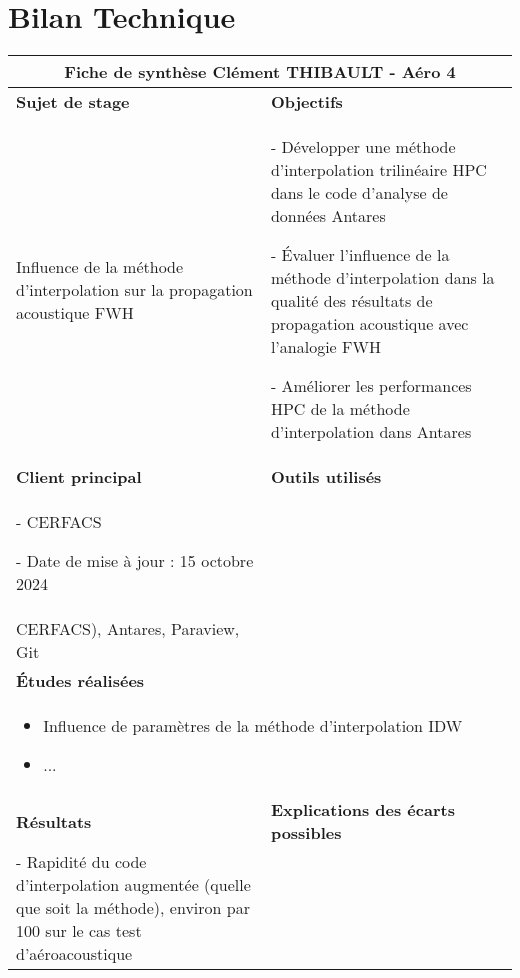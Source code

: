 \section*{Bilan Technique}
\begin{table}[ht]
\centering
\begin{tabular}{|p{8cm}|p{8cm}|}
\hline
\multicolumn{2}{|c|}{\textbf{Fiche de synthèse}   \hspace{7cm}   Clément THIBAULT - Aéro 4} \\ 
\hline
\textbf{Sujet de stage} & \textbf{Objectifs} \\ 
\hline
\begin{minipage}[t]{8cm}
Influence de la méthode d’interpolation sur la propagation acoustique FWH

\end{minipage} & 
\begin{minipage}[t]{8cm}
- Développer une méthode d’interpolation trilinéaire HPC dans le code d’analyse de données Antares

- Évaluer l’influence de la méthode d’interpolation dans la qualité des résultats de propagation acoustique avec l’analogie FWH

- Améliorer les performances HPC de la méthode d’interpolation dans Antares
\end{minipage} \\ 
\hline
\textbf{Client principal} & \textbf{Outils utilisés} \\ 
\hline
\begin{minipage}[t]{8cm}
- CERFACS

- Date de mise à jour : 15 octobre 2024
\end{minipage} & 
\begin{minipage}[t]{8cm}
VSCode, Python, Kraken (supercalculateur du\\
CERFACS), Antares, Paraview, Git
\end{minipage} \\ 
\hline
\multicolumn{2}{|l|}{\textbf{Études réalisées}} \\ 
\hline
\multicolumn{2}{|p{14cm}|}{
\begin{minipage}[t]{14cm}
\begin{itemize}
    \item Influence de paramètres de la méthode d'interpolation IDW
    \item ...
\end{itemize}
\end{minipage}
} \\ 
\hline
\textbf{Résultats} & \textbf{Explications des écarts possibles} \\ 
\hline
\begin{minipage}[t]{8cm}
- Rapidité du code d'interpolation augmentée (quelle que soit la méthode), environ par 100 sur le cas test d'aéroacoustique


\end{minipage}
\end{tabular}
\end{table}
